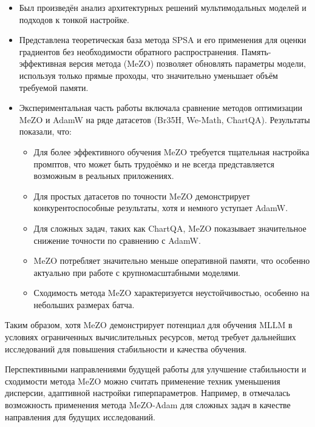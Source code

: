 \documentclass[LI,KR]{HSEUniversity}
\begin{document}
\begin{itemize}
    \item Был произведён анализ архитектурных решений мультимодальных моделей и подходов к тонкой настройке.

    \item Представлена теоретическая база метода SPSA и его применения для оценки градиентов без необходимости обратного распространения.
Память-эффективная версия метода (MeZO) позволяет обновлять параметры модели, используя только прямые проходы, что значительно уменьшает объём требуемой памяти.

    \item Экспериментальная часть работы включала сравнение методов оптимизации MeZO и AdamW на ряде датасетов (Br35H, We-Math, ChartQA). Результаты показали, что:
    \begin{itemize}
        \item Для более эффективного обучения MeZO требуется тщательная настройка промптов, что может быть трудоёмко и не всегда представляется возможным в реальных приложениях.
        \item Для простых датасетов по точности MeZO демонстрирует конкурентоспособные результаты, хотя и немного уступает AdamW.
        \item Для сложных задач, таких как ChartQA, MeZO показывает значительное снижение точности по сравнению с AdamW. %
        \item MeZO потребляет значительно меньше оперативной памяти, что особенно актуально при работе с крупномасштабными моделями.
        \item Сходимость метода MeZO характеризуется неустойчивостью, особенно на небольших размерах батча.
    \end{itemize}
\end{itemize}

Таким образом, хотя MeZO демонстрирует потенциал для обучения MLLM в условиях ограниченных вычислительных ресурсов,
метод требует дальнейших исследований для повышения стабильности и качества обучения.

Перспективными направлениями будущей работы для улучшение стабильности и сходимости метода MeZO
можно считать применение техник уменьшения дисперсии, адаптивной настройки гиперпараметров.
Например, в \cite{mezo} отмечалась возможность применения метода MeZO-Adam для сложных задач в качестве направления для будущих исследований.
\end{document}
